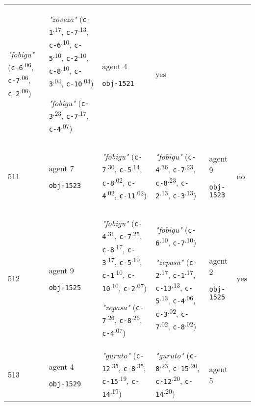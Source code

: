 {\begin{tabular}{p{0.4cm}p{1.4cm}p{7cm}p{7cm}p{1.4cm}p{0.6cm}}
\textit{"fobigu"} (\texttt{c-6}\textsuperscript{.06}, \texttt{c-7}\textsuperscript{.06}, \texttt{c-2}\textsuperscript{.06}) & \textit{"zoveza"} (\texttt{c-1}\textsuperscript{.17}, \texttt{c-7}\textsuperscript{.13}, \texttt{c-6}\textsuperscript{.10}, \texttt{c-5}\textsuperscript{.10}, \texttt{c-2}\textsuperscript{.10}, \texttt{c-8}\textsuperscript{.10}, \texttt{c-3}\textsuperscript{.04}, \texttt{c-10}\textsuperscript{.04})

\textit{"fobigu"} (\texttt{c-3}\textsuperscript{.23}, \texttt{c-7}\textsuperscript{.17}, \texttt{c-4}\textsuperscript{.07}) & agent 4 

 \texttt{obj-1521} & yes \\
511 & agent 7 

\texttt{obj-1523} &\textit{"fobigu"} (\texttt{c-7}\textsuperscript{.30}, \texttt{c-5}\textsuperscript{.14}, \texttt{c-8}\textsuperscript{.02}, \texttt{c-4}\textsuperscript{.02}, \texttt{c-11}\textsuperscript{.02}) & \textit{"fobigu"} (\texttt{c-4}\textsuperscript{.36}, \texttt{c-7}\textsuperscript{.23}, \texttt{c-8}\textsuperscript{.23}, \texttt{c-2}\textsuperscript{.13}, \texttt{c-3}\textsuperscript{.13}) & agent 9 

 \texttt{obj-1523} & no \\
512 & agent 9 

\texttt{obj-1525} &\textit{"fobigu"} (\texttt{c-4}\textsuperscript{.31}, \texttt{c-7}\textsuperscript{.25}, \texttt{c-8}\textsuperscript{.17}, \texttt{c-3}\textsuperscript{.17}, \texttt{c-5}\textsuperscript{.10}, \texttt{c-1}\textsuperscript{.10}, \texttt{c-10}\textsuperscript{.10}, \texttt{c-2}\textsuperscript{.07})

\textit{"zepasa"} (\texttt{c-7}\textsuperscript{.26}, \texttt{c-8}\textsuperscript{.26}, \texttt{c-4}\textsuperscript{.07}) & \textit{"fobigu"} (\texttt{c-6}\textsuperscript{.10}, \texttt{c-7}\textsuperscript{.10})

\textit{"zepasa"} (\texttt{c-2}\textsuperscript{.17}, \texttt{c-1}\textsuperscript{.17}, \texttt{c-13}\textsuperscript{.13}, \texttt{c-5}\textsuperscript{.13}, \texttt{c-4}\textsuperscript{.06}, \texttt{c-3}\textsuperscript{.02}, \texttt{c-7}\textsuperscript{.02}, \texttt{c-8}\textsuperscript{.02}) & agent 2 

 \texttt{obj-1525} & yes \\
513 & agent 4 

\texttt{obj-1529} &\textit{"guruto"} (\texttt{c-12}\textsuperscript{.35}, \texttt{c-8}\textsuperscript{.35}, \texttt{c-15}\textsuperscript{.19}, \texttt{c-14}\textsuperscript{.19}) & \textit{"guruto"} (\texttt{c-8}\textsuperscript{.23}, \texttt{c-15}\textsuperscript{.20}, \texttt{c-12}\textsuperscript{.20}, \texttt{c-14}\textsuperscript{.20}) & agent 5 


\end{tabular}}
